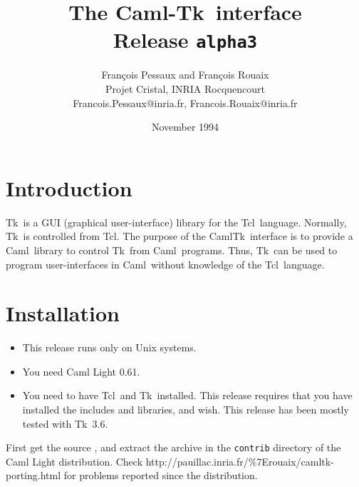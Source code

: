 
\newcommand{\tcl}{{\sf Tcl}}
\newcommand{\tk}{{\sf Tk}}
\newcommand{\caml}{{\sf Caml}}
\newcommand{\camltk}{{\sf CamlTk}}
\newcommand{\wish}{{\sf wish}}
\newcommand{\thisrelease}{{\tt alpha3}}
\title{The \caml-\tk\ interface \\
       Release \thisrelease}
\author{Fran\c{c}ois Pessaux and Fran\c{c}ois Rouaix \\
           Projet Cristal, INRIA Rocquencourt \\
        {\small Francois.Pessaux@inria.fr, Francois.Rouaix@inria.fr}
        }
\date{November 1994}

\maketitle


\section*{Introduction}
\tk\ is a GUI (graphical user-interface) library for the \tcl\ language.
Normally, \tk\ is controlled from \tcl. The purpose of the \camltk\
interface is to provide a \caml\ library to control \tk\ from \caml\
programs. Thus, \tk\ can be used to program user-interfaces in \caml\
without knowledge of the \tcl\ language.

\section*{Installation}

\begin{itemize}
\item This release runs only on Unix systems.
\item You need Caml Light 0.61.
\item You need to have \tcl\ and \tk\ installed. This release requires that
you have installed the includes and libraries, and \wish.
This release has been mostly tested with \tk\ 3.6.
\end{itemize} 

\begin{htmlonly}
First get the source
,
and extract the archive in the {\tt contrib} directory of the Caml Light
distribution. 
Check 
\htmladdnormallink{here}
 {http://pauillac.inria.fr/\%7Erouaix/camltk-porting.html}
for problems reported since the distribution.
\end{htmlonly}

